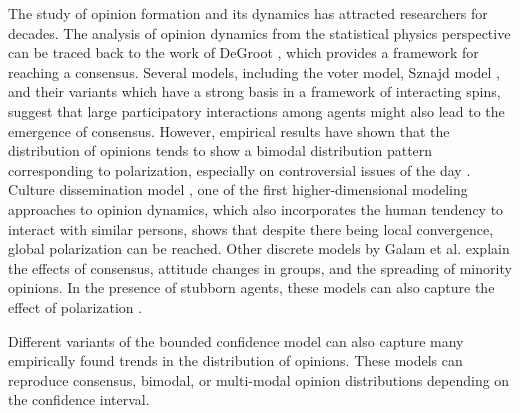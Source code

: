 The study of opinion formation and its dynamics has attracted researchers for decades. The analysis of opinion dynamics from the statistical physics perspective can be traced back to the work of DeGroot \cite{reaching-a-consensus}, which provides a framework for reaching a consensus. Several models, including the voter \cite{the-voter-model, reality-inspired-voter-models-a-mini-review} model, Sznajd model \cite{opinion-evolution-in-closed-community, sznajd-review}, and their variants which have a strong basis in a framework of interacting spins, suggest that large participatory interactions among agents might also lead to the emergence of consensus. However, empirical results have shown that the distribution of opinions tends to show a bimodal distribution pattern corresponding to polarization, especially on controversial issues of the day \cite{biased-assimilation-and-attitude-polarization, have-americans-social-attitudes-become-more-polarized, paritisans-without-constrait-political-polarization-and-trends}. Culture dissemination model \cite{the-dissemination-of-culture}, one of the first higher-dimensional modeling approaches to opinion dynamics, which also incorporates the human tendency to interact with similar persons, shows that despite there being local convergence, global polarization can be reached. Other discrete models by Galam et al. \cite{galam1982sociophysics, galam1991towards, galam2002minority, galam2012sociophysics} explain the effects of consensus, attitude changes in groups, and the spreading of minority opinions. In the presence of stubborn agents, these models can also capture the effect of polarization \cite{galam2007role, galam2016stubbornness, galam2011collective}.

Different variants of the bounded confidence model \cite{mixing-beliefs-among-interacting-agents, opinioin-dynamics-and-bounded-confidence} can also capture many empirically found trends in the distribution of opinions. These models can reproduce consensus, bimodal, or multi-modal opinion distributions depending on the confidence interval.


